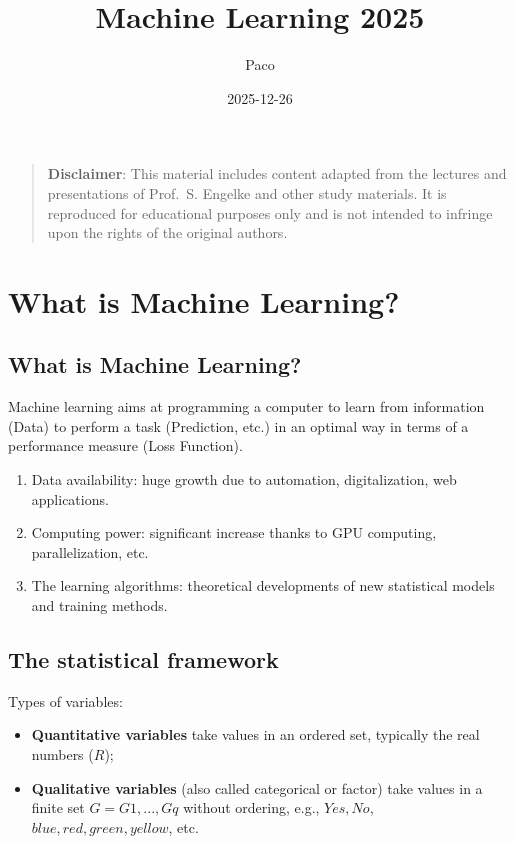 \documentclass[
  letterpaper,
  DIV=11,
  numbers=noendperiod]{scrartcl}
\title{Machine Learning 2025}
\author{Paco}
\date{2025-12-26}
\renewcommand*\contentsname{Table of contents}
\newcommand\contentsname{Table of contents}
\begin{document}
\maketitle

\renewcommand*\contentsname{Table of contents}
{
\hypersetup{linkcolor=}
\setcounter{tocdepth}{1}
\tableofcontents
}

\begin{quote}
\textbf{Disclaimer}: This material includes content adapted from the
lectures and presentations of Prof.~S. Engelke and other study
materials. It is reproduced for educational purposes only and is not
intended to infringe upon the rights of the original authors.
\end{quote}

\newpage

\section{What is Machine Learning?}\label{what-is-machine-learning}

\subsection{What is Machine Learning?}\label{what-is-machine-learning-1}

Machine learning aims at programming a computer to learn from
information (Data) to perform a task (Prediction, etc.) in an optimal
way in terms of a performance measure (Loss Function).

\begin{enumerate}
\def\labelenumi{\arabic{enumi}.}
\item
  Data availability: huge growth due to automation, digitalization, web
  applications.
\item
  Computing power: significant increase thanks to GPU computing,
  parallelization, etc.
\item
  The learning algorithms: theoretical developments of new statistical
  models and training methods.
\end{enumerate}

\subsection{The statistical framework}\label{the-statistical-framework}

Types of variables:

\begin{itemize}
\item
  \textbf{Quantitative variables} take values in an ordered set,
  typically the real numbers (\(R\));
\item
  \textbf{Qualitative variables} (also called categorical or factor)
  take values in a finite set \(G = {G1, . . . , Gq }\) without
  ordering, e.g., \({Yes, No}\), \({blue, red, green, yellow}\), etc.
\end{itemize}
\end{document}
